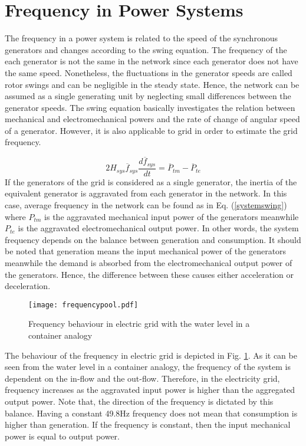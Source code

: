 \section{Frequency in Power Systems}
The frequency in a power system is related to the speed of the synchronous generators and changes according to the swing equation. The frequency of the each generator is not the same in the network since each generator does not have the same speed. Nonetheless, the fluctuations in the generator speeds are called rotor swings and can be negligible in the steady state. Hence, the network can be assumed as a single generating unit by neglecting small differences between the generator speeds. The swing equation basically investigates the relation between mechanical and electromechanical powers and the rate of change of angular speed of a generator. However, it is also applicable to grid in order to estimate the grid frequency.\par
\begin{equation}
\label{systemswing}
2H_{sys}\overline{f}_{sys}\frac{d\overline{f}_{sys}}{dt}=\overline{P}_{tm}-\overline{P}_{te}
\end{equation}
If the generators of the grid is considered as a single generator, the inertia of the equivalent generator is aggravated from each generator in the network. In this case, average frequency in the network can be found as in Eq. (\ref{systemswing}) where $P_{tm}$ is the aggravated mechanical input power of the generators meanwhile $P_{te}$ is the aggravated electromechanical output power. In other words, the system frequency depends on the balance between generation and consumption. It should be noted that generation means the input mechanical power of the generators meanwhile the demand is absorbed from the electromechanical output power of the generators. Hence, the difference between these causes either acceleration or deceleration. \par
\begin{figure}[h!]
	\centering
	\texttt{[image: frequencypool.pdf]}
	\caption{Frequency behaviour in electric grid with the water level in a container analogy \cite{Eto2010}}
	\label{frequencyingrid}
\end{figure}
The behaviour of the frequency in electric grid is depicted in Fig. \ref{frequencyingrid}. As it can be seen from the water level in a container analogy, the frequency of the system is dependent on the in-flow and the out-flow. Therefore, in the electricity grid, frequency increases as the aggravated input power is higher than the aggregated output power. Note that, the direction of the frequency is dictated by this balance. Having a constant 49.8Hz frequency does not mean that consumption is higher than generation. If the frequency is constant, then the input mechanical power is equal to output power.\par
